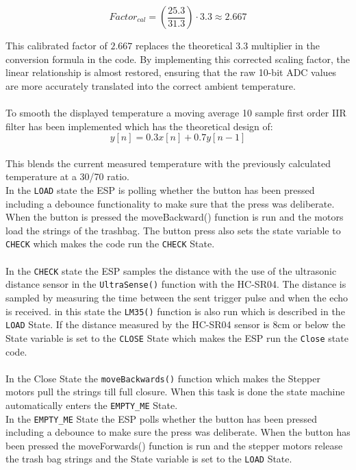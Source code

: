 \documentclass{article}
\begin{document}
\begin{equation}
    Factor_{cal} = \left( \frac{25.3}{31.3} \right) \cdot 3.3 \approx 2.667
\end{equation}

\noindent This calibrated factor of $2.667$ replaces the theoretical $3.3$ multiplier in the conversion formula in the code. By implementing this corrected scaling factor, the linear relationship is almost restored, ensuring that the raw 10-bit ADC values are more accurately translated into the correct ambient temperature.
\\\\
\noindent To smooth the displayed temperature a moving average 10 sample first order IIR filter has been implemented which has the theoretical design of:
\[
y[n] = 0.3x[n] + 0.7y[n-1]
\]\\
This blends the current measured temperature with the previously calculated temperature at a 30/70 ratio. 
\\
In the \texttt{LOAD} state the ESP is polling whether the button has been pressed including a debounce functionality to make sure that the press was deliberate. When the button is pressed the moveBackward() function is run and the motors load the strings of the trashbag. The button press also sets the state  variable to \texttt{CHECK} which makes the code run the \texttt{CHECK} State. \\\\
In the \texttt{CHECK} state the ESP samples the distance with the use of the ultrasonic distance sensor in the \texttt{UltraSense()} function with the HC-SR04. The distance is sampled by measuring the time between the sent trigger pulse and when the echo is received. in this state the \texttt{LM35()} function is also run which is described in the \texttt{LOAD} State. If the distance measured by the HC-SR04 sensor is 8cm or below the State variable is set to the \texttt{CLOSE} State which makes the ESP run the \texttt{Close} state code.\\\\
In the Close State the \texttt{moveBackwards()} function which makes the Stepper motors pull the strings till full closure. When this task is done the state machine automatically enters the \texttt{EMPTY\_ME} State. \\
In the \texttt{EMPTY\_ME} State the ESP polls whether the button has been pressed including a debounce to make sure the press was deliberate. When the button has been pressed the moveForwards() function is run and the stepper motors release the trash bag strings and the State variable is set to the \texttt{LOAD} State.
\end{document}

